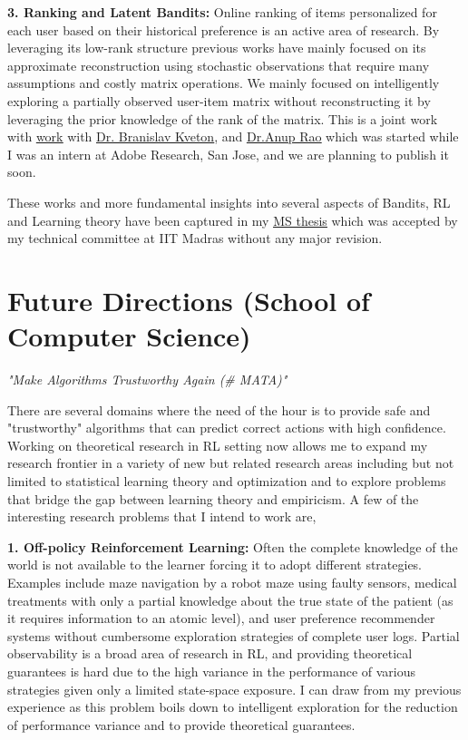 \documentclass{article}
\begin{document}
\textbf{3. Ranking and Latent Bandits:} Online ranking of items personalized for each user based on their historical preference is an active area of research. By leveraging its low-rank structure previous works have mainly focused on its approximate reconstruction using stochastic observations that require many assumptions and costly matrix operations. We mainly focused on intelligently exploring a partially observed user-item matrix without reconstructing it by leveraging the prior knowledge of the rank of the matrix. This is a joint work with  \href{https://subhojyoti.github.io/pdf/paper.pdf}{\underline{\color{blue} work}} with \href{http://www.bkveton.com/}{\underline{\color{red}Dr. Branislav Kveton}}, and \href{https://sites.google.com/site/anupraob/}{\underline{\color{red}Dr.Anup Rao}} which was started while I was an intern at Adobe Research, San Jose, and we are planning to publish it soon.

These works and more fundamental insights into several aspects of Bandits, RL and Learning theory have been captured in my \href{https://www.cse.iitm.ac.in/~ravi/papers/Subhojyoti_thesis.pdf}{\underline{\color{blue}MS thesis}} which was accepted by my technical committee at IIT Madras without any major revision.
     
     
    
\vspace*{-2em}
\section{Future Directions (School of Computer Science)}
\vspace*{-1em}

\begin{center} \textit{"Make Algorithms Trustworthy Again (\# MATA)"}\end{center}

There are several domains where the need of the hour is to provide safe and "trustworthy" algorithms that can predict correct actions with high confidence. Working on theoretical research in RL setting now allows me to expand my research frontier in a variety of new but related research areas including but not limited to statistical learning theory and optimization and to explore problems that bridge the gap between learning theory and empiricism. A few of the interesting research problems
that I intend to work are,

\textbf{1. Off-policy Reinforcement Learning:} Often the complete knowledge of the world is not available to the learner forcing it to adopt different strategies. Examples include maze navigation by a robot maze using faulty sensors, medical treatments with only a partial knowledge about the true state of the patient (as it requires information to
an atomic level), and user preference recommender systems without cumbersome exploration strategies of complete user logs. Partial observability is a broad area of research in RL, and providing theoretical guarantees is hard due to the high variance in the performance of various strategies given only a limited state-space exposure. I can draw from my previous experience as this problem boils down to intelligent exploration for the reduction of performance variance and to provide theoretical guarantees.
\end{document}

